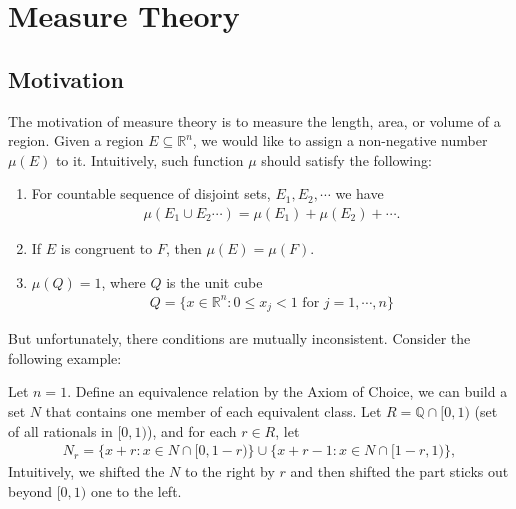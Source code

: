 \chapter{Measure Theory}

\section{Motivation} \label{sec:}

The motivation of measure theory is to measure the length, area, or volume of a region. Given a region $E \subseteq \mathbb{R}^{n}$, we would like to assign a non-negative number $\mu(E)$ to it. Intuitively, such function $\mu$ should satisfy the following:
\begin{enumerate}
    \item For countable sequence of disjoint sets, $E_1, E_2,\cdots $ we have
    \begin{align*}
        \mu(E_1 \cup E_2 \cdots ) = \mu(E_1) + \mu(E_2) +\cdots .
    \end{align*}
    \item If $E$ is congruent to $F$, then $\mu(E) = \mu(F)$.
    \item $\mu(Q) = 1$, where $Q$ is the unit cube
    \begin{align*}
        Q = \{ x \in \mathbb{R}^{n} : 0\le x_j < 1 \text{ for } j = 1,\cdots ,n \}
    \end{align*}
\end{enumerate}

But unfortunately, there conditions are mutually inconsistent. Consider the following example:
\begin{example}
    
    Let $n=1$. Define an equivalence relation by the Axiom of Choice, we can build a set $N$ that contains one member of each equivalent class. Let $R = \mathbb{Q} \cap [0,1)$ (set of all rationals in $[0,1)$), and for each $r \in R$, let 
    \begin{align*}
        N_r = \{ x + r : x \in N \cap [0,1-r) \} \cup \{ x + r - 1 : x \in N \cap [1-r,1) \},
    \end{align*}
    Intuitively, we shifted the $N$ to the right by $r$ and then shifted the part sticks out beyond $[0,1)$ one to the left.
\end{example}


